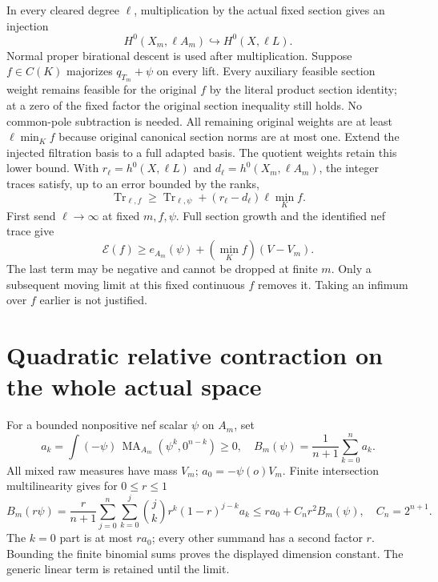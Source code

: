 \documentclass[11pt]{article}
\newcommand{\MA}{\operatorname{MA}}
\begin{document}
In every cleared degree $\ell$, multiplication by the actual
fixed section gives an injection
\[
 H^0(X_m,\ell A_m)\hookrightarrow H^0(X,\ell L).       \tag{11}
\]
Normal proper birational descent is used after multiplication.
Suppose $f\in C(K)$ majorizes $q_{T_m}+\psi$ on every lift.
Every auxiliary feasible section weight remains feasible for
the original $f$ by the literal product section identity; at
a zero of the fixed factor the original section inequality
still holds. No common-pole subtraction is needed.
All remaining original weights are at least $\ell\min_K f$
because original canonical section norms are at most one.
Extend the injected filtration basis to a full adapted basis.
The quotient weights retain this lower bound. With
$r_\ell=h^0(X,\ell L)$ and $d_\ell=h^0(X_m,\ell A_m)$,
the integer traces satisfy, up to an error bounded by the ranks,
\[
 \operatorname{Tr}_{\ell,f}\geq\operatorname{Tr}_{\ell,\psi}
                   +(r_\ell-d_\ell)\ell\min_K f.
\]
First send $\ell\to\infty$ at fixed $m,f,\psi$.
Full section growth and the identified nef trace give
\[
 \mathscr E(f)\geq e_{A_m}(\psi)+(\min_K f)(V-V_m).     \tag{12}
\]
The last term may be negative and cannot be dropped at finite $m$.
Only a subsequent moving limit at this fixed continuous $f$
removes it. Taking an infimum over $f$ earlier is not justified.

\section{Quadratic relative contraction on the whole actual space}
For a bounded nonpositive nef scalar $\psi$ on $A_m$, set
\[
 a_k=\int(-\psi)\,\MA_{A_m}(\psi^k,0^{n-k})\geq0,
 \quad B_m(\psi)=\frac1{n+1}\sum_{k=0}^n a_k.
\]
All mixed raw measures have mass $V_m$; $a_0=-\psi(o)V_m$.
Finite intersection multilinearity gives for $0\leq r\leq1$
\[
 B_m(r\psi)=\frac r{n+1}\sum_{j=0}^n\sum_{k=0}^j
       \binom{j}{k}r^k(1-r)^{j-k}a_k
 \leq r a_0+C_n r^2 B_m(\psi),\quad C_n=2^{n+1}.       \tag{13}
\]
The $k=0$ part is at most $ra_0$; every other summand has a
second factor $r$. Bounding the finite binomial sums proves
the displayed dimension constant. The generic linear term is
retained until the limit.
\end{document}
